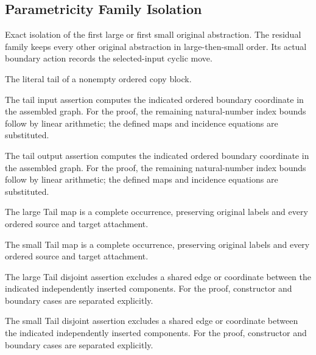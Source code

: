 \subsection{Parametricity Family Isolation}
Exact isolation of the first large or first small original abstraction. The residual family keeps every other original abstraction in large-then-small order. Its actual boundary action records the selected-input cyclic move.

The literal tail of a nonempty ordered copy block.
\par{}

The tail input assertion computes the indicated ordered boundary coordinate in the assembled graph.
For the proof, the remaining natural-number index bounds follow by linear arithmetic; the defined maps and incidence equations are substituted.
\par{}

The tail output assertion computes the indicated ordered boundary coordinate in the assembled graph.
For the proof, the remaining natural-number index bounds follow by linear arithmetic; the defined maps and incidence equations are substituted.
\par{}

The large Tail map is a complete occurrence, preserving original labels and every ordered source and target attachment.
\par{}

The small Tail map is a complete occurrence, preserving original labels and every ordered source and target attachment.
\par{}

The large Tail disjoint assertion excludes a shared edge or coordinate between the indicated independently inserted components.
For the proof, constructor and boundary cases are separated explicitly.
\par{}

The small Tail disjoint assertion excludes a shared edge or coordinate between the indicated independently inserted components.
For the proof, constructor and boundary cases are separated explicitly.
\par{}

